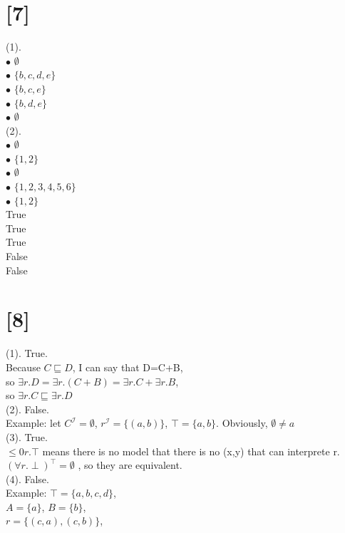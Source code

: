 \documentclass[a4paper,UTF8]{article}
\begin{document}
\section*{[7]}
(1). \\
$\bullet$ $\emptyset$\\
$\bullet$ $\{b,c,d,e\}$\\
$\bullet$ $\{b,c,e\}$\\
$\bullet$ $\{b,d,e\}$\\
$\bullet$ $\emptyset$\\
(2). \\
$\bullet$ $\emptyset$\\
$\bullet$ $\{1,2\}$\\
$\bullet$ $\emptyset$\\
$\bullet$ $\{1,2,3,4,5,6\}$\\
$\bullet$ $\{1,2\}$\\
True\\
True\\
True\\
False\\
False\\

\section*{[8]}
(1). True.\\
Because $C\sqsubseteq D$, I can say that D=C+B, \\
so $\exists r.D=\exists r.(C+B)=\exists r.C+\exists r.B$, \\
so $\exists r.C \sqsubseteq \exists r.D$ \\
(2). False.\\
Example: let $C^\mathcal{I} =\emptyset $, $r^\mathcal{I}=\{(a,b)\}$, $\top=\{a,b\}$. Obviously,
$\emptyset \neq {a}$\\
(3). True.\\
$\leq 0r.\top$ means there is no model that there is no (x,y) that can interprete r. 
$(\forall r.\perp)^\top=\emptyset $ , so they are equivalent.\\
(4). False.\\
Example: $\top=\{a,b,c,d\}$,\\ $A=\{a\}$, $B=\{b\}$, \\
$r=\{(c,a),(c,b)\}$,
\end{document}
